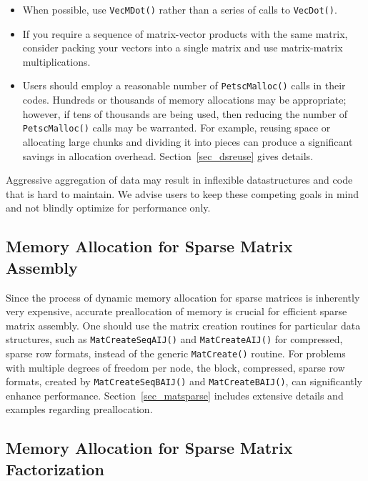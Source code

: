 {{{\begin{itemize}
\item When possible, use \lstinline{VecMDot()} rather than a series of calls to \lstinline{VecDot()}.

\item If you require a sequence of matrix-vector products with the same matrix, consider packing your vectors into a single matrix and use matrix-matrix multiplications.

\item Users should employ a reasonable number of \lstinline{PetscMalloc()} calls in their codes.
Hundreds or thousands of memory allocations may be appropriate; however, if tens of
thousands are being used, then reducing the number of \lstinline{PetscMalloc()} calls
may be warranted.  For example, reusing space or allocating large chunks
and dividing it into pieces can produce a significant savings in
allocation overhead.  Section~\ref{sec_dsreuse} gives details.
\end{itemize}
Aggressive aggregation of data may result in inflexible datastructures and code that is hard to maintain.
We advise users to keep these competing goals in mind and not blindly optimize for performance only.


\subsection{Memory Allocation for Sparse Matrix Assembly}
\label{sec_perf_memory}

Since the process of dynamic memory allocation for sparse matrices is
inherently very expensive, accurate preallocation of memory is crucial
for efficient sparse matrix assembly.  One should use the matrix creation
routines for particular data structures, such as \lstinline{MatCreateSeqAIJ()} and \lstinline{MatCreateAIJ()} for compressed, sparse
row formats, instead of the generic \lstinline{MatCreate()} routine.  For
problems with multiple degrees of freedom per node, the block,
compressed, sparse row formats, created by \lstinline{MatCreateSeqBAIJ()}
and \lstinline{MatCreateBAIJ()}, can significantly enhance performance.
Section~\ref{sec_matsparse} includes extensive details and
examples regarding preallocation.

\subsection{Memory Allocation for Sparse Matrix Factorization}
\label{sec_symbolfactor}

}}}
